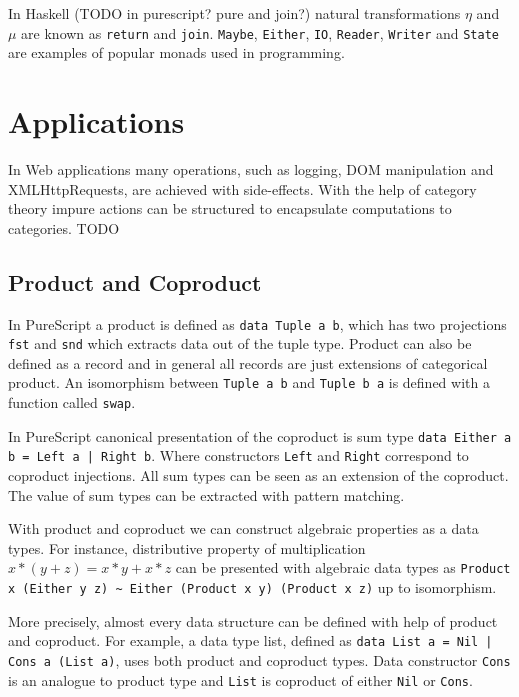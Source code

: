 \documentclass[article]{aaltoseries}
\begin{document}
    In Haskell (TODO in purescript? pure and join?) natural transformations $\eta$ and $\mu$ are known as
    \lstinline|return| and \lstinline|join|. \lstinline|Maybe|,
    \lstinline|Either|, \lstinline|IO|, \lstinline|Reader|, \lstinline|Writer|
    and \lstinline|State| are examples of popular monads used in programming.



\section{Applications}

In Web applications many operations, such as logging, DOM manipulation and
XMLHttpRequests, are achieved with side-effects. With the help of category
theory impure actions can be structured to encapsulate computations to
categories. TODO

  \subsection{Product and Coproduct}
    In PureScript a product is defined as \lstinline|data Tuple a b|, which has
    two projections \lstinline|fst| and \lstinline|snd| which extracts data out
    of the tuple type. Product can also be defined as a record and in general
    all records are just extensions of categorical product. An isomorphism
    between \lstinline|Tuple a b| and \lstinline|Tuple b a| is defined with a
    function called \lstinline|swap|.
    
    In PureScript canonical presentation of the coproduct is sum type
    \lstinline{data Either a b = Left a | Right b}. Where constructors
    \lstinline|Left| and \lstinline|Right| correspond to coproduct injections.
    All sum types can be seen as an extension of the coproduct. The value of sum
    types can be extracted with pattern matching.
    
    With product and coproduct we can construct algebraic properties as a data
    types. For instance, distributive property of multiplication $x * (y + z) =
    x * y + x * z$ can be presented with algebraic data types as
    \lstinline|Product x (Either y z) ~ Either (Product x y) (Product x z)| up
    to isomorphism.

    More precisely, almost every data structure can be defined with help of
    product and coproduct. For example, a data type list, defined as
    \lstinline{data List a = Nil | Cons a (List a)}, uses both product and
    coproduct types. Data constructor \lstinline|Cons| is an analogue to product
    type and \lstinline|List| is coproduct of either \lstinline|Nil| or \lstinline|Cons|.
\end{document}
